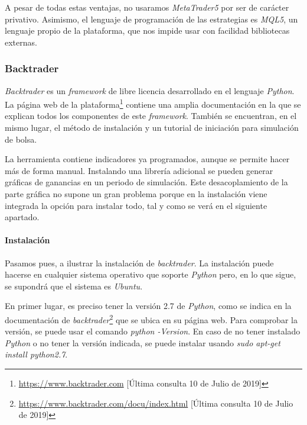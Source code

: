 		A pesar de todas estas ventajas, no usaramos \textit{MetaTrader5} por ser de car\'acter privativo. Asimismo, el lenguaje de programaci\'on de las estrategias es \textit{MQL5}, un lenguaje propio de la plataforma, que nos impide usar con facilidad bibliotecas externas.
	
		\subsubsection{Backtrader}\label{sec:backtrader}
		
		\textit{Backtrader} es un \textit{framework} de libre licencia desarrollado en el lenguaje \textit{Python}. La p\'agina web de la plataforma\footnote{\url{https://www.backtrader.com} [\'Ultima consulta 10 de Julio de 2019]} contiene una amplia documentaci\'on en la que se explican todos los componentes de este \textit{framework}. Tambi\'en se encuentran, en el mismo lugar, el m\'etodo de instalaci\'on y un tutorial de iniciaci\'on para simulaci\'on de bolsa.
		
		La herramienta contiene indicadores ya programados, aunque se permite hacer m\'as de forma manual.  Instalando una librer\'ia adicional se pueden generar gr\'aficas de ganancias en un periodo de simulaci\'on. Este desacoplamiento de la parte gr\'afica no supone un gran problema porque en la instalaci\'on viene integrada la opci\'on para instalar todo, tal y como se ver\'a en el siguiente apartado.\\
		
		
		\paragraph{Instalaci\'on}\label{sec:install}
		
		Pasamos pues, a ilustrar la instalaci\'on de \textit{backtrader}. La instalaci\'on puede hacerse en cualquier sistema operativo que soporte \textit{Python} pero, en lo que sigue, se supondr\'a que el sistema es \textit{Ubuntu}. 
		
		En primer lugar, es preciso tener la versi\'on 2.7 de \textit{Python}, como se indica en la documentaci\'on de \textit{backtrader}\footnote{\url{https://www.backtrader.com/docu/index.html} [\'Ultima consulta 10 de Julio de 2019]} que se ubica en su p\'agina web. Para comprobar la versi\'on, se puede usar el comando \textit{python -Version}. En caso de no tener instalado \textit{Python} o no tener la versi\'on indicada, se puede instalar usando \textit{sudo apt-get install python2.7}.\\
		
